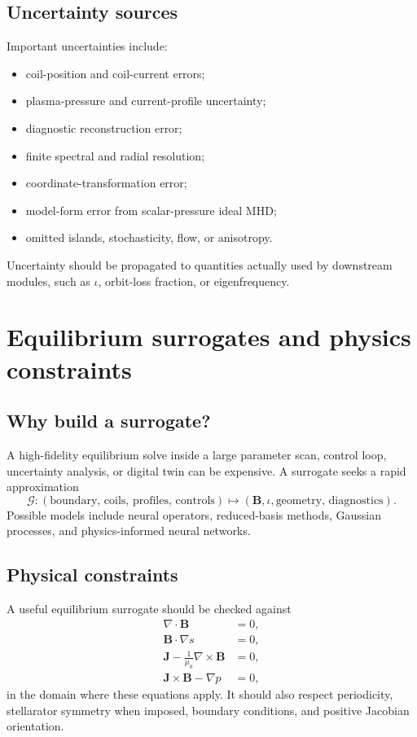 \subsection{Uncertainty sources}
Important uncertainties include:
\begin{itemize}[leftmargin=1.6em]
\item coil-position and coil-current errors;
\item plasma-pressure and current-profile uncertainty;
\item diagnostic reconstruction error;
\item finite spectral and radial resolution;
\item coordinate-transformation error;
\item model-form error from scalar-pressure ideal MHD;
\item omitted islands, stochasticity, flow, or anisotropy.
\end{itemize}
Uncertainty should be propagated to quantities actually used by downstream modules, such as $\iota$, orbit-loss fraction, or eigenfrequency.

\section{Equilibrium surrogates and physics constraints}
\label{sec:surrogates}

\subsection{Why build a surrogate?}
A high-fidelity equilibrium solve inside a large parameter scan, control loop, uncertainty analysis, or digital twin can be expensive. A surrogate seeks a rapid approximation
\begin{equation}
\mathcal G:
\left(\text{boundary, coils, profiles, controls}\right)
\mapsto
\left(\mathbf B,\iota,\text{geometry, diagnostics}\right).
\end{equation}
Possible models include neural operators, reduced-basis methods, Gaussian processes, and physics-informed neural networks.

\subsection{Physical constraints}
A useful equilibrium surrogate should be checked against
\begin{align}
\nabla\cdot\mathbf B&=0,\\
\mathbf B\cdot\nabla s&=0,\\
\mathbf J-\frac{1}{\mu_0}\nabla\times\mathbf B&=0,\\
\mathbf J\times\mathbf B-\nabla p&=0,
\end{align}
in the domain where these equations apply. It should also respect periodicity, stellarator symmetry when imposed, boundary conditions, and positive Jacobian orientation.

